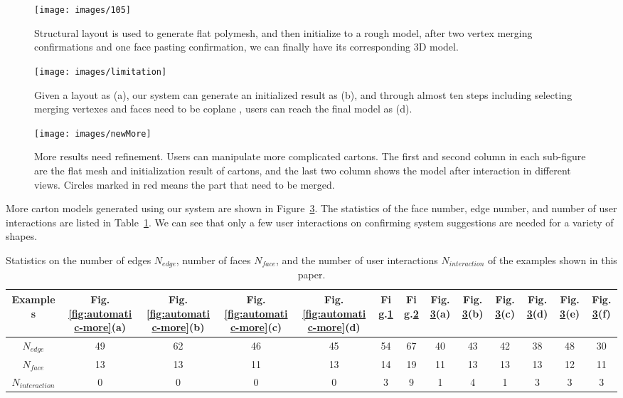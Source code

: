 \begin{figure}
	\centering
	\texttt{[image: images/105]}
	\caption{Structural layout is used to generate flat polymesh, and then initialize to a rough model, after two vertex merging confirmations and one face pasting confirmation, we can finally have its corresponding 3D model.}
	\label{fig:result}
\end{figure}
%





\begin{figure}
	\centering
	\texttt{[image: images/limitation]}
	\caption{Given a layout as (a), our system can generate an initialized result as (b), and through almost ten steps including selecting merging vertexes and faces need to be coplane , users can reach the final model as (d). }
	\label{fig:hexagon}
\end{figure}


\begin{figure}
	\centering
	\texttt{[image: images/newMore]}
	\caption{More results need refinement. Users can manipulate more complicated cartons. The first and second column in each sub-figure are the flat mesh and initialization result of cartons, and the last two column shows the model after interaction in  different views. Circles marked in red means the part that need to be merged.}
	\label{fig:result-more}
\end{figure}



More carton models generated using our system  are shown in Figure~\ref{fig:result-more}.
The statistics of the face number, edge number, and number of user interactions are listed in Table~\ref{table:statistics}. 
We can see that only a few user interactions on confirming system suggestions are needed for a variety of shapes.


\begin{table}
	\centering
	\caption{Statistics on the number of edges $N_{edge}$, number of faces $N_{face}$, and the number of user interactions $N_{interaction}$ of the examples shown in this paper.}
	\setlength{\tabcolsep}{1pt}
	\begin{tabular}{c|c|c|c|c|c|c|c|c|c|c|c|c}
		\hline
		Examples & Fig.\ref{fig:automatic-more}(a) & Fig.\ref{fig:automatic-more}(b) &  Fig.\ref{fig:automatic-more}(c) & Fig.\ref{fig:automatic-more}(d) & Fig.\ref{fig:result} & Fig.\ref{fig:hexagon} & Fig.\ref{fig:result-more}(a) & Fig.\ref{fig:result-more}(b)& Fig.\ref{fig:result-more}(c) &  Fig.\ref{fig:result-more}(d) & Fig.\ref{fig:result-more}(e)& Fig.\ref{fig:result-more}(f)\\
		\hline
		$N_{edge}$ & 49 & 62 & 46 & 45 & 54 & 67 & 40 & 43 & 42 & 38 & 48 & 30\\
		$N_{face}$  & 13 & 13 & 11 & 13 & 14 & 19 & 11 & 13 & 13 & 13 & 12 & 11\\
		$N_{interaction}$  & 0 & 0 & 0 & 0 & 3 & 9 & 1 & 4 & 1 & 3 & 3 & 3\\ 
		\hline
		\end{tabular}
		\label{table:statistics}
\end{table}


